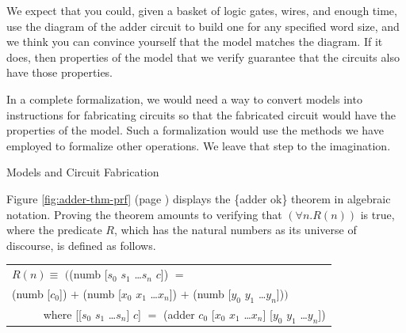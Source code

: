 \begin{aside}
We expect that you could, given a basket of
logic gates, wires, and enough time,
use the diagram of the adder circuit to
build one for any specified word size,
and we think you can convince yourself that the model
matches the diagram.
If it does, then properties of the model
that we verify guarantee that the circuits also have those properties.

In a complete formalization, we would
need a way to convert models into instructions
for fabricating circuits so that
the fabricated circuit would have the properties
of the model. Such a formalization
would use the methods we have employed to formalize other operations.
We leave that step to the imagination.
\caption{Models and Circuit Fabrication}
\label{circuit-vs-model}
\end{aside}

Figure \ref{fig:adder-thm-prf} (page \pageref{fig:adder-thm-prf})
displays the \{adder ok\} theorem in algebraic notation.
Proving the theorem amounts to
verifying that $(\forall n.R(n))$ is true,
where the predicate $R$, which has the natural numbers as
its universe of discourse, is defined as follows.
\begin{center}
\begin{tabular}{l}
$R(n) \equiv$ $($\textsf{(numb [$s_0$ $s_1$ \dots $s_{n}$ $c$])} $=$\\
\phantom{$R(n) \equiv$ $($}\textsf{(numb [$c_0$])} $+$ \textsf{(numb [$x_0$ $x_1$ \dots $x_{n}$])} $+$ \textsf{(numb [$y_0$ $y_1$ \dots $y_{n}$])}$)$ \\
~~~~~ where \textsf{[[$s_0$ $s_1$ \dots $s_{n}$] $c$]} $=$ \textsf{(adder $c_0$ [$x_0$ $x_1$ \dots $x_{n}$] [$y_0$ $y_1$ \dots $y_{n}$])}\\
\end{tabular}
\end{center}

